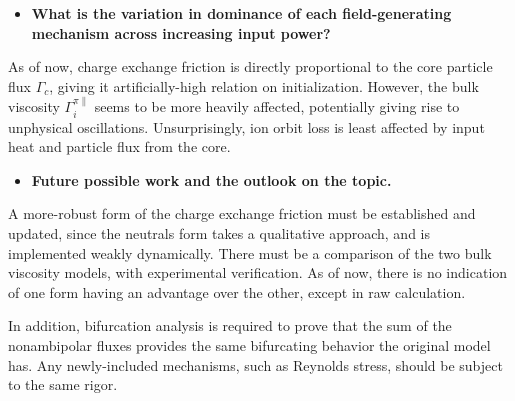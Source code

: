 \begin{itemize}
	\item \textbf{What is the variation in dominance of each field-generating mechanism across increasing input power?}
\end{itemize}

As of now, charge exchange friction is directly proportional to the core particle flux $\Gamma_c$, giving it artificially-high relation on initialization.
However, the bulk viscosity $\Gamma_i^{\pi\parallel}$ seems to be more heavily affected, potentially giving rise to unphysical oscillations.
Unsurprisingly, ion orbit loss is least affected by input heat and particle flux from the core.


\begin{itemize}
	\item \textbf{Future possible work and the outlook on the topic.}
\end{itemize}

A more-robust form of the charge exchange friction must be established and updated, since the neutrals form takes a qualitative approach, and is implemented weakly dynamically.
There must be a comparison of the two bulk viscosity models, with experimental verification.
As of now, there is no indication of one form having an advantage over the other, except in raw calculation.

In addition, bifurcation analysis is required to prove that the sum of the nonambipolar fluxes provides the same bifurcating behavior the original model has.
Any newly-included mechanisms, such as Reynolds stress, should be subject to the same rigor.

